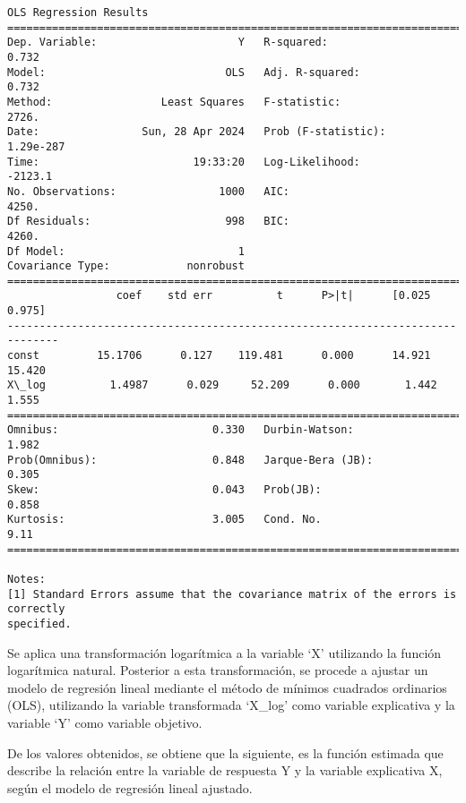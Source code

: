 \documentclass[11pt]{article}
\begin{document}
    \begin{Verbatim}[commandchars=\\\{\}]
                            OLS Regression Results
==============================================================================
Dep. Variable:                      Y   R-squared:                       0.732
Model:                            OLS   Adj. R-squared:                  0.732
Method:                 Least Squares   F-statistic:                     2726.
Date:                Sun, 28 Apr 2024   Prob (F-statistic):          1.29e-287
Time:                        19:33:20   Log-Likelihood:                -2123.1
No. Observations:                1000   AIC:                             4250.
Df Residuals:                     998   BIC:                             4260.
Df Model:                           1
Covariance Type:            nonrobust
==============================================================================
                 coef    std err          t      P>|t|      [0.025      0.975]
------------------------------------------------------------------------------
const         15.1706      0.127    119.481      0.000      14.921      15.420
X\_log          1.4987      0.029     52.209      0.000       1.442       1.555
==============================================================================
Omnibus:                        0.330   Durbin-Watson:                   1.982
Prob(Omnibus):                  0.848   Jarque-Bera (JB):                0.305
Skew:                           0.043   Prob(JB):                        0.858
Kurtosis:                       3.005   Cond. No.                         9.11
==============================================================================

Notes:
[1] Standard Errors assume that the covariance matrix of the errors is correctly
specified.
    \end{Verbatim}

    Se aplica una transformación logarítmica a la variable `X' utilizando la
función logarítmica natural. Posterior a esta transformación, se procede
a ajustar un modelo de regresión lineal mediante el método de mínimos
cuadrados ordinarios (OLS), utilizando la variable transformada `X\_log'
como variable explicativa y la variable `Y' como variable objetivo.

De los valores obtenidos, se obtiene que la siguiente, es la función
estimada que describe la relación entre la variable de respuesta Y y la
variable explicativa X, según el modelo de regresión lineal ajustado.
\end{document}
